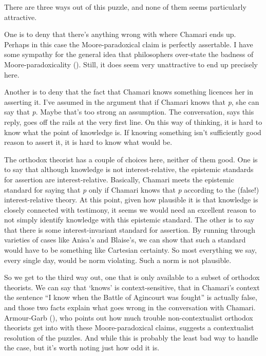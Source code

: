 \documentclass[
  12pt,
  letterpaper,
]{scrbook}
\begin{document}
There are three ways out of this puzzle, and none of them seems
particularly attractive.

One is to deny that there's anything wrong with where Chamari ends up.
Perhaps in this case the Moore-paradoxical claim is perfectly
assertable. I have some sympathy for the general idea that philosophers
over-state the badness of Moore-paradoxicality
().
Still, it does seem very unattractive to end up precisely here.

Another is to deny that the fact that Chamari knows something licences
her in asserting it. I've assumed in the argument that if Chamari knows
that \emph{p}, she can say that \emph{p}. Maybe that's too strong an
assumption. The conversation, says this reply, goes off the rails at the
very first line. On this way of thinking, it is hard to know what the
point of knowledge is. If knowing something isn't sufficiently good
reason to assert it, it is hard to know what would be.

The orthodox theorist has a couple of choices here, neither of them
good. One is to say that although knowledge is not interest-relative,
the epistemic standards for assertion are interest-relative. Basically,
Chamari meets the epistemic standard for saying that \emph{p} only if
Chamari knows that \emph{p} according to the (false!) interest-relative
theory. At this point, given how plausible it is that knowledge is
closely connected with testimony, it seems we would need an excellent
reason to not simply identify knowledge with this epistemic standard.
The other is to say that there is some interest-invariant standard for
assertion. By running through varieties of cases like Anisa's and
Blaise's, we can show that such a standard would have to be something
like Cartesian certainty. So most everything we say, every single day,
would be norm violating. Such a norm is not plausible.

So we get to the third way out, one that is only available to a subset
of orthodox theorists. We can say that `knows' is context-sensitive,
that in Chamari's context the sentence ``I know when the Battle of
Agincourt was fought'' is actually false, and those two facts explain
what goes wrong in the conversation with Chamari. Armour-Garb
(), who points out how much trouble
non-contextualist orthodox theorists get into with these
Moore-paradoxical claims, suggests a contextualist resolution of the
puzzles. And while this is probably the least bad way to handle the
case, but it's worth noting just how odd it is.
\end{document}
